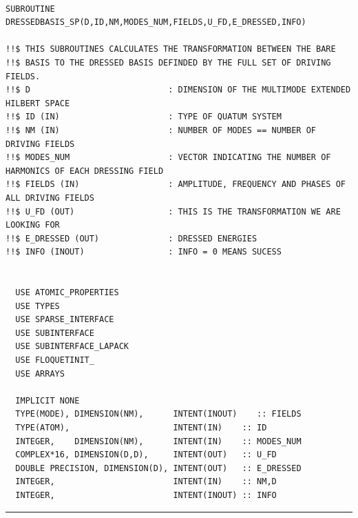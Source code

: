 \documentclass[10pt,a4paper]{article}
\begin{document}
\begin{verbatim}

SUBROUTINE DRESSEDBASIS_SP(D,ID,NM,MODES_NUM,FIELDS,U_FD,E_DRESSED,INFO)

!!$ THIS SUBROUTINES CALCULATES THE TRANSFORMATION BETWEEN THE BARE 
!!$ BASIS TO THE DRESSED BASIS DEFINDED BY THE FULL SET OF DRIVING FIELDS.
!!$ D                            : DIMENSION OF THE MULTIMODE EXTENDED HILBERT SPACE
!!$ ID (IN)                      : TYPE OF QUATUM SYSTEM
!!$ NM (IN)                      : NUMBER OF MODES == NUMBER OF DRIVING FIELDS
!!$ MODES_NUM                    : VECTOR INDICATING THE NUMBER OF HARMONICS OF EACH DRESSING FIELD
!!$ FIELDS (IN)                  : AMPLITUDE, FREQUENCY AND PHASES OF ALL DRIVING FIELDS
!!$ U_FD (OUT)                   : THIS IS THE TRANSFORMATION WE ARE LOOKING FOR
!!$ E_DRESSED (OUT)              : DRESSED ENERGIES
!!$ INFO (INOUT)                 : INFO = 0 MEANS SUCESS
               

  USE ATOMIC_PROPERTIES
  USE TYPES
  USE SPARSE_INTERFACE
  USE SUBINTERFACE
  USE SUBINTERFACE_LAPACK
  USE FLOQUETINIT_ 
  USE ARRAYS 

  IMPLICIT NONE
  TYPE(MODE), DIMENSION(NM),      INTENT(INOUT)    :: FIELDS
  TYPE(ATOM),                     INTENT(IN)    :: ID
  INTEGER,    DIMENSION(NM),      INTENT(IN)    :: MODES_NUM
  COMPLEX*16, DIMENSION(D,D),     INTENT(OUT)   :: U_FD
  DOUBLE PRECISION, DIMENSION(D), INTENT(OUT)   :: E_DRESSED
  INTEGER,                        INTENT(IN)    :: NM,D
  INTEGER,                        INTENT(INOUT) :: INFO
\end{verbatim}
\begin{center}
\rule{12cm}{1pt}
\end{center}
\end{document}
